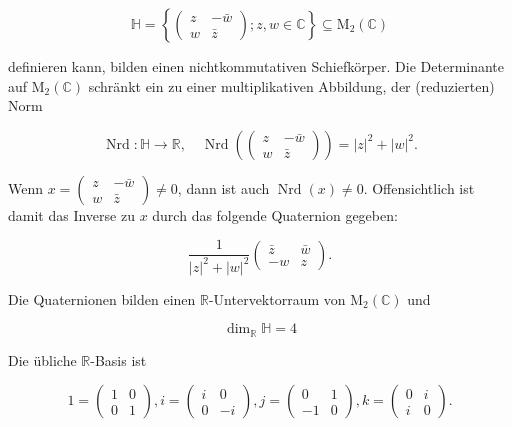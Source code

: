 \documentclass[10pt, letterpaper]{article}
\begin{document}
$$
\mathbb{H}=\left\{\left(\begin{array}{cc}
z & -\bar{w} \\
w & \bar{z}
\end{array}\right) ; z, w \in \mathbb{C}\right\} \subseteq \mathrm{M}_{2}(\mathbb{C})
$$

definieren kann, bilden einen nichtkommutativen Schiefkörper. Die Determinante auf $\mathrm{M}_{2}(\mathbb{C})$ schränkt ein zu einer multiplikativen Abbildung, der (reduzierten) Norm

$$
\operatorname{Nrd}: \mathbb{H} \rightarrow \mathbb{R}, \quad \operatorname{Nrd}\left(\left(\begin{array}{cc}
z & -\bar{w} \\
w & \bar{z}
\end{array}\right)\right)=|z|^{2}+|w|^{2} .
$$

Wenn $x=\left(\begin{array}{cc}z & -\bar{w} \\ w & \bar{z}\end{array}\right) \neq 0$, dann ist auch $\operatorname{Nrd}(x) \neq 0$. Offensichtlich ist damit das Inverse zu $x$ durch das folgende Quaternion gegeben:

$$
\frac{1}{|z|^{2}+|w|^{2}}\left(\begin{array}{cc}
\bar{z} & \bar{w} \\
-w & z
\end{array}\right) .
$$

Die Quaternionen bilden einen $\mathbb{R}$-Untervektorraum von $\mathrm{M}_{2}(\mathbb{C})$ und

$$
\operatorname{dim}_{\mathbb{R}} \mathbb{H}=4
$$

Die übliche $\mathbb{R}$-Basis ist

$$
1=\left(\begin{array}{cc}
1 & 0 \\
0 & 1
\end{array}\right), i=\left(\begin{array}{cc}
i & 0 \\
0 & -i
\end{array}\right), j=\left(\begin{array}{cc}
0 & 1 \\
-1 & 0
\end{array}\right), k=\left(\begin{array}{cc}
0 & i \\
i & 0
\end{array}\right) .
$$
\end{document}
